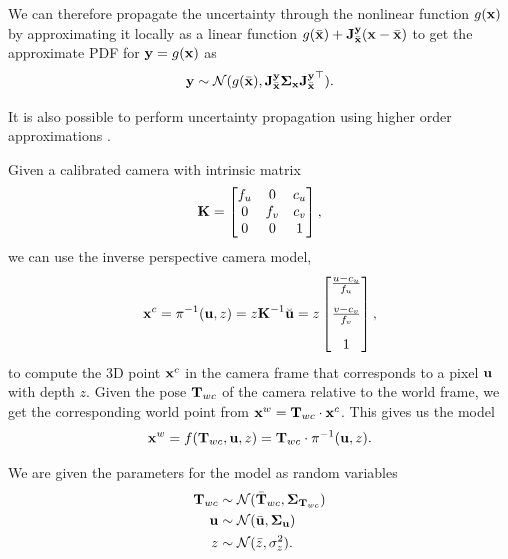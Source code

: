 We can therefore propagate the uncertainty through the nonlinear function $g(\vecx)$ by approximating it locally as a linear function $g(\bar{\vecx}) +  \jac{\vecy}{\bar{\vecx}}(\vecx - \bar{\vecx})$ to get the approximate PDF for $\vecy = g(\vecx)$ as
\begin{equation}
  \vecy \sim \cN(g(\bar{\vecx}), \jac{\vecy}{\bar{\vecx}}  \matSigma_\vecx \jac{\vecy}{\bar{\vecx}}\trans).
\end{equation}

It is also possible to perform uncertainty propagation using higher order approximations \cite{barfoot2017state}.

\begin{example}[frametitle=Uncertainty in backprojection] \label{ex:uncertainty-backrpojection}
Given a calibrated camera with intrinsic matrix
\begin{equation}
  \matK =
    \begin{bmatrix}
    f_u & 0 & c_u\\
    0 & f_v & c_v\\
    0 & 0 & 1
  \end{bmatrix},
\end{equation}
we can use the inverse perspective camera model,
\begin{equation}
  \vecx^c = \pi^{-1}(\vecu, z) = z \matK^{-1}
  \breve{\vecu}
  = z
  \begin{bmatrix}
   \frac{u - c_u}{f_u}\\[1em]
   \frac{v - c_v}{f_v}\\[1em]
    1
  \end{bmatrix},
\end{equation}
to compute the 3D point $\vecx^c$ in the camera frame that corresponds to a pixel $\vecu$ with depth $z$.
Given the pose $\matT_{wc}$ of the camera relative to the world frame, we get the corresponding world point from $\vecx^w = \matT_{wc} \cdot \vecx^c$.
This gives us the model
\begin{equation}
  \vecx^w = f(\matT_{wc}, \vecu, z) = \matT_{wc} \cdot \pi^{-1}(\vecu, z).
\end{equation}

We are given the parameters for the model as random variables
\begin{align}
  \matT_{wc} &\sim \cN(\bar{\matT}_{wc}, \matSigma_{\matT_{wc}})\\
  \vecu &\sim \cN(\bar{\vecu}, \matSigma_{\vecu})\\
  z &\sim \cN(\bar{z}, \sigma^2_z).
\end{align}


\end{example}
